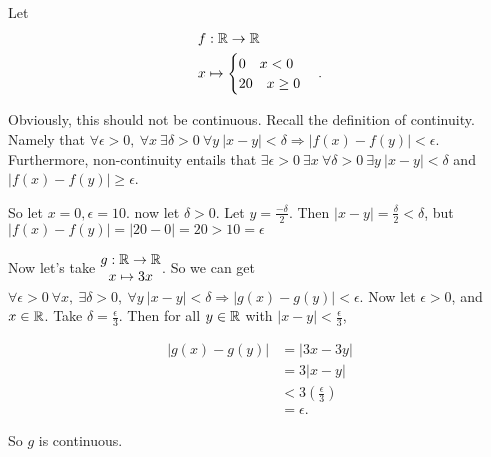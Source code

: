 \documentclass[12pt, twosided]{article}
\begin{document}
\begin{exa}
  Let
  \begin{align*}
    &f: \mathbb{R} \to \mathbb{R} \\
    &x \mapsto
    \begin{cases}
      0 \quad x < 0 \\
      20 \quad x \geq 0
    \end{cases}.
  \end{align*}

  Obviously, this should not be continuous. Recall the definition of continuity. Namely that \(\forall \epsilon > 0,\ \forall x\ \exists \delta > 0\ \forall y\ | x - y | < \delta \Rightarrow |f(x) - f(y)| < \epsilon\). Furthermore, non-continuity entails that \(\exists \epsilon > 0\ \exists x\ \forall \delta > 0\ \exists y\ |x - y| < \delta\) and \(|f(x) - f(y)| \geq \epsilon\).

  So let \(x = 0, \epsilon = 10.\) now let \(\delta > 0\). Let \(y = \frac{-\delta}{2}\). Then \(|x - y| = \frac{\delta}{2} < \delta\), but \(|f(x) - f(y)| = |20 -0| = 20 > 10 = \epsilon\)
\end{exa}

Now let's take \(\begin{matrix} g: \mathbb{R} \to \mathbb{R} \\  x \mapsto 3x\end{matrix}
\). So we can get \(\forall \epsilon > 0\ \forall x,\ \exists \delta > 0,\ \forall y\ |x - y| < \delta \Rightarrow |g(x) - g(y)| < \epsilon\).
Now let \(\epsilon > 0\), and \(x \in \mathbb{R}\). Take \(\delta = \frac{\epsilon}{3}\). Then for all \(y \in \mathbb{R}\) with \(|x -y| < \frac{\epsilon}{3}\),

\begin{align*}
  |g(x) - g(y)| &= |3x - 3y| \\
                &= 3|x - y| \\
                &< 3\left(\frac{\epsilon}{3}\right) \\
                &= \epsilon.
\end{align*}

So \(g\) is continuous.
\end{document}
